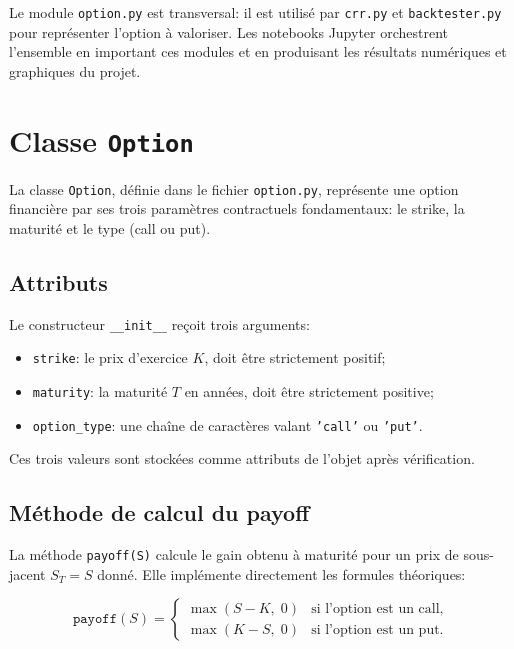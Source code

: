 \documentclass[11pt]{report}
\begin{document}
Le module \texttt{option.py} est transversal: il est utilisé par \texttt{crr.py} 
et \texttt{backtester.py} pour représenter l'option à valoriser. Les notebooks Jupyter orchestrent l'ensemble en important ces modules et en produisant les résultats numériques et graphiques du projet.

\section{Classe \texttt{Option}}

La classe \texttt{Option}, définie dans le fichier \texttt{option.py}, représente une option financière par ses trois paramètres contractuels fondamentaux: le strike, la maturité et le type (call ou put).

\subsection{Attributs}

Le constructeur \texttt{\_\_init\_\_} reçoit trois arguments:

\begin{itemize}
    \item \texttt{strike}: le prix d'exercice $K$, doit être strictement positif;
    \item \texttt{maturity}: la maturité $T$ en années, doit être strictement positive;
    \item \texttt{option\_type}: une chaîne de caractères valant \texttt{'call'} ou \texttt{'put'}.
\end{itemize}

Ces trois valeurs sont stockées comme attributs de l'objet après vérification.

\subsection{Méthode de calcul du payoff}

La méthode \texttt{payoff(S)} calcule le gain obtenu à maturité pour un prix de sous-jacent $S_T = S$ donné. Elle implémente directement les formules théoriques:

\[
\texttt{payoff}(S) =
\begin{cases}
\max(S - K,\; 0) & \text{si l'option est un call,} \\
\max(K - S,\; 0) & \text{si l'option est un put.}
\end{cases}
\]
\end{document}
